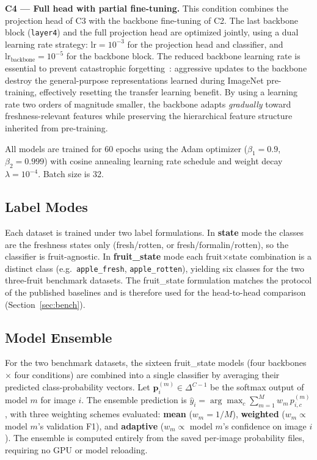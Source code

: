 \documentclass[conference]{IEEEtran}
\begin{document}
\textbf{C4 — Full head with partial fine-tuning.}
This condition combines the projection head of C3 with the backbone
fine-tuning of C2.
The last backbone block (\texttt{layer4}) and the full projection head
are optimized jointly, using a dual learning rate strategy:
$\text{lr} = 10^{-3}$ for the projection head and classifier, and
$\text{lr}_\text{backbone} = 10^{-5}$ for the backbone block.
The reduced backbone learning rate is essential to prevent catastrophic
forgetting~\cite{kirkpatrick2017catastrophic}: aggressive updates to the
backbone destroy the general-purpose representations learned during
ImageNet pre-training, effectively resetting the transfer learning benefit.
By using a learning rate two orders of magnitude smaller, the backbone
adapts \textit{gradually} toward freshness-relevant features while
preserving the hierarchical feature structure inherited from pre-training.

All models are trained for 60 epochs using the Adam optimizer
($\beta_1 = 0.9$, $\beta_2 = 0.999$) with cosine annealing learning
rate schedule and weight decay $\lambda = 10^{-4}$.
Batch size is 32.

\subsection{Label Modes}

Each dataset is trained under two label formulations.
In \textbf{state} mode the classes are the freshness states only
(fresh/rotten, or fresh/formalin/rotten), so the classifier is
fruit-agnostic.
In \textbf{fruit\_state} mode each fruit$\times$state combination is a
distinct class (e.g.\ \texttt{apple\_fresh}, \texttt{apple\_rotten}),
yielding six classes for the two three-fruit benchmark datasets.
The fruit\_state formulation matches the protocol of the published
baselines and is therefore used for the head-to-head comparison
(Section~\ref{sec:bench}).

\subsection{Model Ensemble}
\label{sec:ensmethod}

For the two benchmark datasets, the sixteen fruit\_state models
(four backbones $\times$ four conditions) are combined into a single
classifier by averaging their predicted class-probability vectors.
Let $\mathbf{p}^{(m)}_i \in \Delta^{C-1}$ be the softmax output of model
$m$ for image $i$.
The ensemble prediction is $\hat{y}_i = \arg\max_c \sum_{m=1}^{M} w_m\,
p^{(m)}_{i,c}$, with three weighting schemes evaluated:
\textbf{mean} ($w_m = 1/M$),
\textbf{weighted} ($w_m \propto$ model $m$'s validation F1), and
\textbf{adaptive} ($w_m \propto$ model $m$'s confidence on image $i$).
The ensemble is computed entirely from the saved per-image probability
files, requiring no GPU or model reloading.
\end{document}
